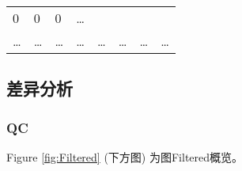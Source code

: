 \documentclass[
]{article}
\begin{document}
\begin{longtable}[]{@{}llllllll@{}}
\begin{minipage}[t]{0.11\columnwidth}
0\strut
\end{minipage} & \begin{minipage}[t]{0.11\columnwidth}\raggedright
0\strut
\end{minipage} & \begin{minipage}[t]{0.11\columnwidth}\raggedright
0\strut
\end{minipage} & \begin{minipage}[t]{0.03\columnwidth}\raggedright
\ldots{}\strut
\end{minipage}\tabularnewline
\begin{minipage}[t]{0.11\columnwidth}\raggedright
\ldots{}\strut
\end{minipage} & \begin{minipage}[t]{0.11\columnwidth}\raggedright
\ldots{}\strut
\end{minipage} & \begin{minipage}[t]{0.11\columnwidth}\raggedright
\ldots{}\strut
\end{minipage} & \begin{minipage}[t]{0.11\columnwidth}\raggedright
\ldots{}\strut
\end{minipage} & \begin{minipage}[t]{0.11\columnwidth}\raggedright
\ldots{}\strut
\end{minipage} & \begin{minipage}[t]{0.11\columnwidth}\raggedright
\ldots{}\strut
\end{minipage} & \begin{minipage}[t]{0.11\columnwidth}\raggedright
\ldots{}\strut
\end{minipage} & \begin{minipage}[t]{0.03\columnwidth}\raggedright
\ldots{}\strut
\end{minipage}\tabularnewline
\bottomrule
\end{longtable}

\hypertarget{ux5deeux5f02ux5206ux6790}{%
\subsection{差异分析}\label{ux5deeux5f02ux5206ux6790}}

\hypertarget{qc-1}{%
\subsubsection{QC}\label{qc-1}}

Figure \ref{fig:Filtered} (下方图) 为图Filtered概览。
\end{document}

